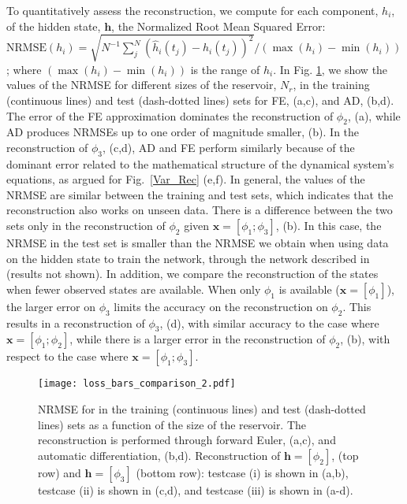 \documentclass[runningheads]{llncs}
\begin{document}
To quantitatively assess the reconstruction, we compute for each component, $h_i$, of the hidden state, $\mathbf{h}$, the Normalized Root Mean Squared Error: $\textrm{NRMSE}(h_i) = \sqrt{N^{-1}\sum_{j}^{N}(\hat{h}_i(t_j)-h_i(t_j))^2}/( \max(h_i)   -  \min(h_i))$;
where $( \allowbreak \max(h_i)  \allowbreak - \min(h_i))$ is the range of $h_i$. In Fig. \ref{loss_bar}, we show the values of the NRMSE for different sizes of the reservoir, $N_r$, in the training (continuous lines) and test (dash-dotted lines) sets for FE, (a,c), and AD, (b,d). The error of the FE approximation dominates the reconstruction of $\phi_2$, (a), while AD produces NRMSEs up to one order of magnitude smaller, (b). In the reconstruction of $\phi_3$, (c,d), AD and FE perform similarly because of the dominant error related to the mathematical structure of the dynamical system's equations, as argued for Fig.~\ref{Var_Rec} (e,f). In general, the values of the NRMSE are similar between the training and test sets, which indicates that the reconstruction also works  on unseen data. There is a difference between the two sets only in the reconstruction of $\phi_2$ given $\mathbf{x}=[\phi_1;\phi_3]$, (b). In this case, the NRMSE in the test set is smaller than the NRMSE we obtain when using data on the hidden state to train the network, through the network described in \cite{lu2017reservoir} (results not shown). In addition, we compare the reconstruction of the states when fewer observed states are available. When only $\phi_1$ is available ($\mathbf{x}=[\phi_1]$), the larger error on $\phi_3$ limits the accuracy on the reconstruction on $\phi_2$. This results in a reconstruction of $\phi_3$, (d), with similar accuracy to the case where $\mathbf{x}=[\phi_1;\phi_2]$, while there is a larger error in the reconstruction of $\phi_2$, (b), with respect to the case where $\mathbf{x}=[\phi_1;\phi_3]$.   
\begin{figure}
    \centering
    \texttt{[image: loss\_bars\_comparison\_2.pdf]}
    \caption{NRMSE for in the training (continuous lines) and test (dash-dotted lines) sets as a function of the size of the reservoir. The reconstruction is performed through forward Euler, (a,c), and automatic differentiation, (b,d). Reconstruction of $\mathbf{h}=[\phi_2]$, (top row) and $\mathbf{h}=[\phi_3]$ (bottom row): testcase (i) is shown in (a,b), testcase (ii) is shown in (c,d), and testcase (iii) is shown in (a-d).}
    \label{loss_bar}
\end{figure}
\end{document}

